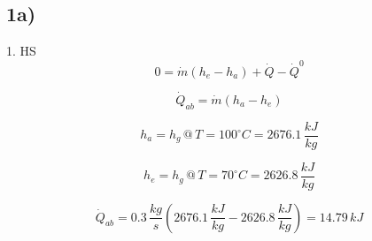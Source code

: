 

\subsection*{1a)}
1. HS
\[
0 = \dot{m} (h_e - h_a) + \dot{Q} - \dot{Q}^0
\]

\[
\dot{Q}_{ab} = \dot{m} (h_a - h_e)
\]

\[
h_a = h_g \, @ \, T = 100^\circ C = 2676.1 \, \frac{kJ}{kg}
\]

\[
h_e = h_g \, @ \, T = 70^\circ C = 2626.8 \, \frac{kJ}{kg}
\]

\[
\dot{Q}_{ab} = 0.3 \, \frac{kg}{s} \left( 2676.1 \, \frac{kJ}{kg} - 2626.8 \, \frac{kJ}{kg} \right) = 14.79 \, kJ
\]